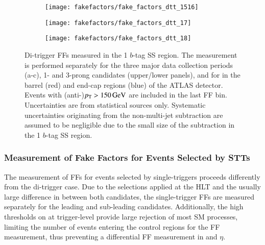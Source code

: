 \begin{figure}[htbp]
  \centering

  \begin{subfigure}{0.495\textwidth}
    \texttt{[image: fakefactors/fake\_factors\_dtt\_1516]}
  \end{subfigure}
  \begin{subfigure}{0.495\textwidth}
    \texttt{[image: fakefactors/fake\_factors\_dtt\_17]}
  \end{subfigure}

  \begin{subfigure}{0.495\textwidth}
    \texttt{[image: fakefactors/fake\_factors\_dtt\_18]}
  \end{subfigure}

  \caption{Di-\tauhadvis trigger FFs measured in the 1 $b$-tag SS region. The
    measurement is performed separately for the three major data collection
    periods (a-c), 1- and 3-prong \tauhadvis candidates (upper/lower panels),
    and for \tauhadvis in the barrel (red) and end-cap regions (blue) of the
    ATLAS detector. Events with (anti-)\tauhadvis $p_{\text{T}} > \SI{150}{\ensuremath{\text{GeV}}}$ are
    included in the last FF bin. Uncertainties are from statistical sources
    only. Systematic uncertainties originating from the non-multi-jet
    subtraction are assumed to be negligible due to the small size of the
    subtraction in the 1 $b$-tag SS region.}%
  \label{fig:mjfakes_fake_factors}
\end{figure}


\subsubsection{Measurement of Fake Factors for Events Selected by STTs}

The measurement of FFs for events selected by single-\tauhadvis triggers
proceeds differently from the di-\tauhadvis trigger case. Due to the selections
applied at the HLT and the usually large difference in \pT between both
\tauhadvis candidates, the single-\tauhadvis trigger FFs are measured separately
for the leading and sub-leading \tauhadvis candidates. Additionally, the high
\pT thresholds on \tauhadvis at trigger-level provide large rejection of most SM
processes, limiting the number of events entering the control regions for the FF
measurement, thus preventing a differential FF measurement in \tauhadvis \pT and
$\eta$.

